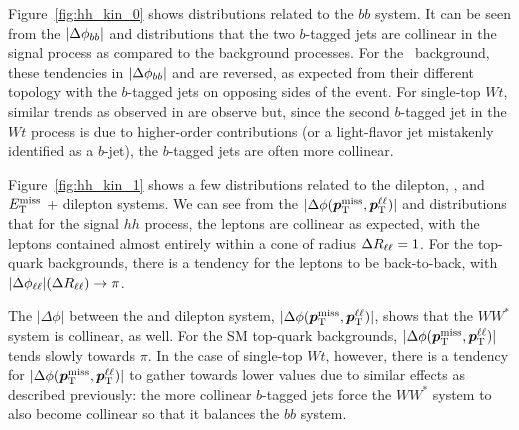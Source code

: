 Figure~\ref{fig:hh_kin_0} shows distributions related to the $bb$ system.
It can be seen from the $|\Delta \phi_{bb}|$ and \drbb distributions that the two $b$-tagged jets
are collinear in the signal process as compared to the background processes.
For the \ttbar~background, these tendencies in $|\Delta \phi_{bb}|$ and \drbb are reversed,
as expected from their different topology with the $b$-tagged jets on opposing sides of the event.
For single-top $Wt$, similar trends as observed in \ttbar are observe but, since the second $b$-tagged
jet in the $Wt$ process is due to higher-order contributions (or a light-flavor jet mistakenly identified as a $b$-jet),
the $b$-tagged jets are often more collinear.

Figure~\ref{fig:hh_kin_1} shows a few distributions related to the dilepton, \met, and $E_{\text{T}}^{\text{miss}}$ + dilepton systems.
We can see from the $|\Delta \phi (\bm{p}_{\text{T}}^{\text{miss}}, \bm{p}_{\text{T}}^{\ell\ell})|$ and \drll distributions that for the signal $hh$ process, the leptons
are collinear as expected, with the leptons contained almost entirely within a cone of radius $\Delta R_{\ell\ell} = 1$.
For the top-quark backgrounds, there is a tendency for the leptons to be back-to-back, with $|\Delta \phi_{\ell\ell}| (\Delta R_{\ell\ell}) \rightarrow \pi$.

The $|\Delta \phi|$ between the \met and dilepton system, $|\Delta \phi (\bm{p}_{\text{T}}^{\text{miss}}, \bm{p}_{\text{T}}^{\ell\ell})|$, shows that the $WW^*$ system is collinear, as well.
For the SM top-quark backgrounds, $|\Delta \phi (\bm{p}_{\text{T}}^{\text{miss}}, \bm{p}_{\text{T}}^{\ell\ell})|$ tends slowly towards $\pi$.
In the case of single-top $Wt$, however, there is a tendency for $|\Delta \phi (\bm{p}_{\text{T}}^{\text{miss}}, \bm{p}_{\text{T}}^{\ell\ell})|$ to gather towards lower values due
to similar effects as described previously: the more collinear $b$-tagged jets force the
$WW^*$ system to also become collinear so that it balances the $bb$ system.

